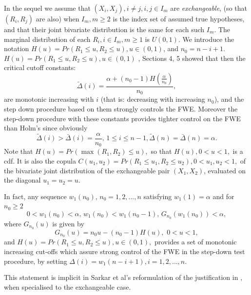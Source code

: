 \documentclass[12pt,fleqn] {article}
\begin{document}
In the sequel we assume that $(X_i, X_j), i \neq j, i,j \in I_{m}$ are {\it exchangeable}, (so that $(R_i, R_j)$ are also) when $I_{m}, m \geq 2$ is the index set of assumed true hypotheses, and that their joint bivariate distribution is the same  for each such $I_{m}.$
The marginal distribution of each $R_i, i \in I_{m}, m \geq 1$ is $U(0,1).$
We introduce the notation $H(u) = Pr(R_1 \leq u, R_2 \leq u) , u \in (0,1)$, and $n_0 = n - i +1.$ 
$H(u) = Pr(R_1 \leq u, R_2 \leq u) , u \in (0,1)$
\cite{senetaSequentiallyRejectiveTest1997}, Sections 4, 5 showed that then the critical cutoff constants:
\begin{equation} \label{CS1}
{\tilde \Delta}(i) = \frac{\alpha + (n_0 -1) H(\frac{\alpha}{n_0})}{n_0},
\end{equation} are monotonic increasing with $i$ (that is: decreasing with increasing $n_0$), and the step down procedure based on them strongly controls the FWE.  Moreover the step-down procedure with these constants provides tighter control on the FWE than Holm's since obviously
\begin{equation*}
{\tilde \Delta}(i) > {\bar \Delta}(i) = \frac{\alpha}{n_0}, \, 1 \leq i \leq n-1, {\tilde \Delta}(n) = {\bar \Delta}(n) = \alpha.
\end{equation*}
 Note that $ H(u) =  Pr( \max (R_1, R_2) \leq u ),$ so that  $H(u), 0 < u < 1, $ is a cdf. It is also the  copula $ C(u_1, u_2) = Pr(R_1 \leq u_1, R_2 \leq u_2), 0 < u_1, u_2 <1,$ of the bivariate joint distribution of the exchangeable pair $(X_1, X_2)$, evaluated on the diagonal $ u_1 = u_2 = u.$


In fact, any sequence $w_1(n_0),\,  n_0=1,2,\ldots,n$ satisfying  $w_1(1) = \alpha$ and for $n_0 \geq 2$ \begin{equation} \label{statset} 0 < w_1(n_0) < \alpha, \,  w_1(n_0) < w_1(n_0 -1), \,  G_{n_0}(w_1(n_0)) < \alpha, \end{equation} where $G_{n_0}(u)$ is given by 
\begin{equation} \label{G}
G_{n_0}(u) = n_0 u - (n_0 -1) H(u), \, \, 0 < u < 1,
\end{equation}
and $H(u) = Pr(R_1 \leq u, R_2 \leq u) , u \in (0,1),$ provides a set of monotonic increasing cut-offs which assure strong control of the FWE in the step-down test procedure, by  setting 
$\Delta(i)= w_1(n-i+1), i=1,2, \ldots , n.$

This statement is implicit in Sarkar et al's reformulation of the justification in \cite{senetaSimpleStepwiseTests2005}, when specialised to the exchangeable case.  
\end{document}
